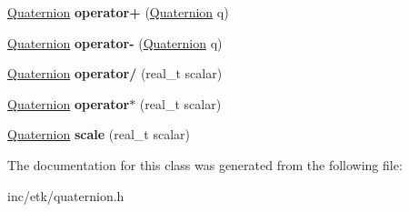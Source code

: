 \begin{DoxyCompactItemize}
\item 
\hypertarget{classetk_1_1_quaternion_a661853921fda0ca0cd44f52bea9196bf}{\hyperlink{classetk_1_1_quaternion}{Quaternion} {\bfseries operator+} (\hyperlink{classetk_1_1_quaternion}{Quaternion} q)}\label{classetk_1_1_quaternion_a661853921fda0ca0cd44f52bea9196bf}

\item 
\hypertarget{classetk_1_1_quaternion_a5294305248643853bc3258f24930cece}{\hyperlink{classetk_1_1_quaternion}{Quaternion} {\bfseries operator-\/} (\hyperlink{classetk_1_1_quaternion}{Quaternion} q)}\label{classetk_1_1_quaternion_a5294305248643853bc3258f24930cece}

\item 
\hypertarget{classetk_1_1_quaternion_a6bfa691aee831a47197f3727816f8fde}{\hyperlink{classetk_1_1_quaternion}{Quaternion} {\bfseries operator/} (real\-\_\-t scalar)}\label{classetk_1_1_quaternion_a6bfa691aee831a47197f3727816f8fde}

\item 
\hypertarget{classetk_1_1_quaternion_a17ac38d3f0915350ec123fa14650eda6}{\hyperlink{classetk_1_1_quaternion}{Quaternion} {\bfseries operator$\ast$} (real\-\_\-t scalar)}\label{classetk_1_1_quaternion_a17ac38d3f0915350ec123fa14650eda6}

\item 
\hypertarget{classetk_1_1_quaternion_ab84bfddfbd1c918d4dc5ef4681d41322}{\hyperlink{classetk_1_1_quaternion}{Quaternion} {\bfseries scale} (real\-\_\-t scalar)}\label{classetk_1_1_quaternion_ab84bfddfbd1c918d4dc5ef4681d41322}

\end{DoxyCompactItemize}


The documentation for this class was generated from the following file\-:\begin{DoxyCompactItemize}
\item 
inc/etk/quaternion.\-h\end{DoxyCompactItemize}
